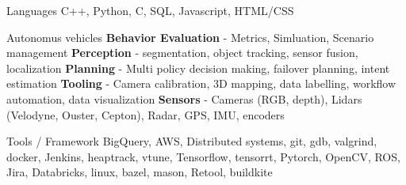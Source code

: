 \vspace{-3mm}

\begin{cvskills}

  \cvskill
    {Languages} %
    {C++, Python, C, SQL, Javascript, HTML/CSS} %

  \cvskill
	{Autonomus vehicles} %
	{\textbf{Behavior Evaluation} - Metrics, Simluation, Scenario management\linebreak
	\textbf{Perception} - segmentation, object tracking, sensor fusion, localization\linebreak
	\textbf{Planning} - Multi policy decision making, failover planning, intent estimation\linebreak
	\textbf{Tooling} - Camera calibration, 3D mapping, data labelling, workflow automation, data visualization\linebreak
	\textbf{Sensors} - Cameras (RGB, depth), Lidars (Velodyne, Ouster, Cepton), Radar, GPS, IMU, encoders} %

	\cvskill
	{Tools / Framework} %
	{BigQuery, AWS, Distributed systems, git, gdb, valgrind, docker, Jenkins, heaptrack, vtune, Tensorflow, tensorrt, Pytorch, OpenCV, ROS, Jira, Databricks, linux, bazel, mason, Retool, buildkite} %
\end{cvskills}
